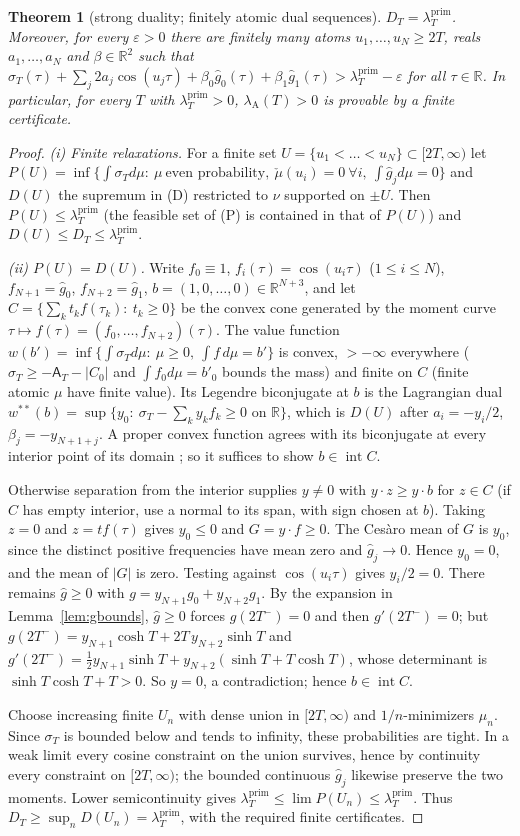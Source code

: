 \documentclass[10pt]{amsart}
\newtheorem{theorem}{Theorem}[section]
\theoremstyle{definition}
\theoremstyle{remark}
\newcommand{\R}{\mathbb R}
\newcommand{\lamP}{\lambda^{\mathrm{prim}}_T}
\newcommand{\lamA}{\lambda_{\mathrm A}(T)}
\newcommand{\sT}{\sigma_T}
\newcommand{\gh}[1]{\widehat g_{#1}}
\newcommand{\Aconst}{\mathsf A_T}
\begin{document}
\begin{theorem}[strong duality; finitely atomic dual sequences]\label{thm:D1}
$D_T=\lamP$. Moreover, for every $\varepsilon>0$ there are finitely many atoms
$u_1,\dots,u_N\ge2T$, reals $a_1,\dots,a_N$ and $\beta\in\R^2$ such that
$\sT(\tau)+\sum_j2a_j\cos(u_j\tau)+\beta_0\gh0(\tau)+\beta_1\gh1(\tau)>\lamP-\varepsilon$ for all $\tau\in\R$.
In particular, for every $T$ with $\lamP>0$, $\lamA>0$ is provable by a finite certificate.
\end{theorem}
\begin{proof}
\emph{(i) Finite relaxations.} For a finite set $U=\{u_1<\dots<u_N\}\subset[2T,\infty)$ let
$P(U)=\inf\{\int\sT d\mu:\ \mu\ \text{even probability},\ \check\mu(u_i)=0\ \forall i,\ \int\gh j d\mu=0\}$
and $D(U)$ the supremum in (D) restricted to $\nu$ supported on $\pm U$. Then $P(U)\le\lamP$
(the feasible set of (P) is contained in that of $P(U)$) and $D(U)\le D_T\le\lamP$.

\emph{(ii) $P(U)=D(U)$.} Write $f_0\equiv1$, $f_i(\tau)=\cos(u_i\tau)$ ($1\le i\le N$),
$f_{N+1}=\gh0$, $f_{N+2}=\gh1$, $b=(1,0,\dots,0)\in\R^{N+3}$, and let
$C=\{\sum_kt_kf(\tau_k):\ t_k\ge0\}$ be the convex cone generated by the moment curve
$\tau\mapsto f(\tau)=(f_0,\dots,f_{N+2})(\tau)$. The value function
$w(b')=\inf\{\int\sT d\mu:\ \mu\ge0,\ \int f\,d\mu=b'\}$ is convex, $>-\infty$ everywhere
($\sT\ge-\Aconst-|C_0|$ and $\int f_0d\mu=b'_0$ bounds the mass) and finite on $C$ (finite atomic
$\mu$ have finite value). Its Legendre biconjugate at $b$ is the Lagrangian dual
$w^{**}(b)=\sup\{y_0:\ \sT-\sum_ky_kf_k\ge0\text{ on }\R\}$, which is $D(U)$ after
$a_i=-y_i/2$, $\beta_j=-y_{N+1+j}$. A proper convex function agrees with its biconjugate at every
interior point of its domain \cite[Thm.~7.4, Cor.~12.1.1]{Rockafellar}; so it suffices to show
$b\in\operatorname{int}C$.

Otherwise separation from the interior supplies $y\ne0$ with
$y\cdot z\ge y\cdot b$ for $z\in C$ (if $C$ has empty interior, use
a normal to its span, with sign chosen at $b$). Taking $z=0$ and
$z=tf(\tau)$ gives $y_0\le0$ and $G=y\cdot f\ge0$. The Ces\`aro mean
of $G$ is $y_0$, since the distinct positive frequencies have mean zero
and $\gh j\to0$. Hence $y_0=0$, and the mean of $|G|$ is zero.
Testing against $\cos(u_i\tau)$ gives $y_i/2=0$. There remains
$\widehat g\ge0$ with $g=y_{N+1}g_0+y_{N+2}g_1$. By the expansion in Lemma~\ref{lem:gbounds},
$\widehat g\ge0$ forces $g(2T^-)=0$ and then $g'(2T^-)=0$; but
$g(2T^-)=y_{N+1}\cosh T+2T\,y_{N+2}\sinh T$ and $g'(2T^-)=\frac12y_{N+1}\sinh T+y_{N+2}(\sinh T+T\cosh T)$,
whose determinant is $\sinh T\cosh T+T>0$. So $y=0$, a contradiction; hence $b\in\operatorname{int}C$.

Choose increasing finite $U_n$ with dense union in $[2T,\infty)$
and $1/n$-minimizers $\mu_n$. Since $\sigma_T$ is bounded below and tends to
infinity, these probabilities are tight. In a weak limit every cosine
constraint on the union survives, hence by continuity every constraint
on $[2T,\infty)$; the bounded continuous $\gh j$ likewise preserve the
two moments. Lower semicontinuity gives $\lamP\le\lim P(U_n)\le\lamP$.
Thus $D_T\ge\sup_n D(U_n)=\lamP$, with the required finite certificates.
\end{proof}
\end{document}
